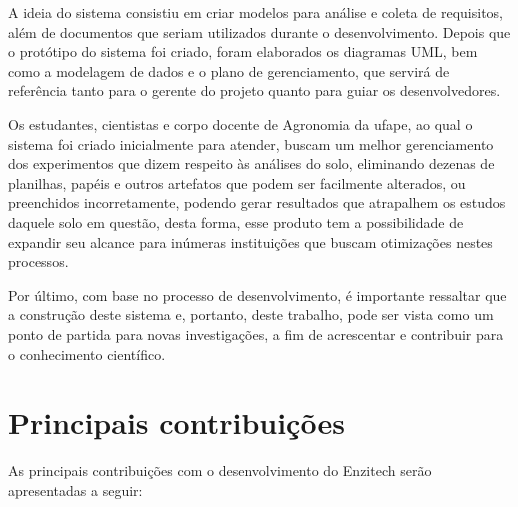 A ideia do sistema consistiu em criar modelos para análise e coleta de requisitos, além de documentos que seriam utilizados durante o desenvolvimento. Depois que o protótipo do sistema foi criado, foram elaborados os diagramas UML, bem como a modelagem de dados e o plano de gerenciamento, que servirá de referência tanto para o gerente do projeto quanto para guiar os desenvolvedores.

Os estudantes, cientistas e corpo docente de Agronomia da \ac{ufape}, ao qual o sistema foi criado inicialmente para atender, buscam um melhor gerenciamento dos experimentos que dizem respeito às análises do solo, eliminando dezenas de planilhas, papéis e outros artefatos que podem ser facilmente alterados, ou preenchidos incorretamente, podendo gerar resultados que atrapalhem os estudos daquele solo em questão, desta forma, esse produto tem a possibilidade de expandir seu alcance para inúmeras instituições que buscam otimizações nestes processos.

Por último, com base no processo de desenvolvimento, é importante ressaltar que a construção deste sistema e, portanto, deste trabalho, pode ser vista como um ponto de partida para novas investigações, a fim de acrescentar e contribuir para o conhecimento científico.

\section{Principais contribuições}\label{sec:contribuicoes}
As principais contribuições com o desenvolvimento do Enzitech serão apresentadas a seguir:

